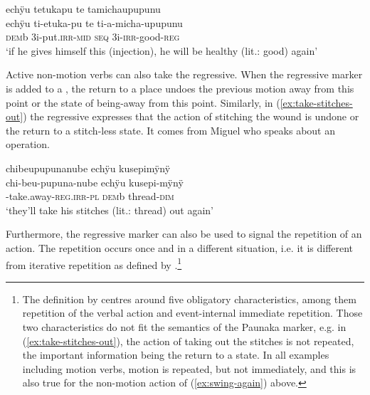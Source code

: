\ea\label{ex:health-regressive}
\begingl 
\glpreamble echÿu tetukapu te tamichaupupunu\\
\gla echÿu ti-etuka-pu te ti-a-micha-upupunu\\ 
\glb \textsc{dem}b 3i-put.\textsc{irr}-\textsc{mid} \textsc{seq} 3i-\textsc{irr}-good-\textsc{reg}\\ 
\glft ‘if he gives himself this (injection), he will be healthy (lit.: good) again’
\trailingcitation{[jxx-p110923l-1.068]}
\xe

Active non-motion verbs can also take the regressive. When the regressive marker is added to a , the return to a place undoes the previous motion away from this point or the state of being-away from this point. Similarly, in (\ref{ex:take-stitches-out}) the regressive expresses that the action of stitching the wound is undone or the return to a stitch-less state. It comes from Miguel who speaks about an operation.

\ea\label{ex:take-stitches-out}
\begingl 
\glpreamble chibeupupunanube echÿu kusepimÿnÿ\\
\gla chi-beu-pupuna-nube echÿu kusepi-mÿnÿ\\ 
-take.away-\textsc{reg.irr}-\textsc{pl} \textsc{dem}b thread-\textsc{dim}\\ 
\glft ‘they’ll take his stitches (lit.: thread) out again’
\trailingcitation{[mqx-p110826l.330]}
\xe

Furthermore, the regressive marker can also be used to signal the repetition of an action. The repetition occurs once and in a different situation, i.e. it is different from iterative repetition as defined by \citet[97]{Mueller2013}.\footnote{The definition by \citet[97]{Mueller2013} centres around five obligatory characteristics, among them repetition of the verbal action and event-internal immediate repetition. Those two characteristics do not fit the semantics of the Paunaka marker, e.g. in (\ref{ex:take-stitches-out}), the action of taking out the stitches is not repeated, the important information being the return to a state. In all examples including motion verbs, motion is repeated, but not immediately, and this is also true for the non-motion action of (\ref{ex:swing-again}) above.}





